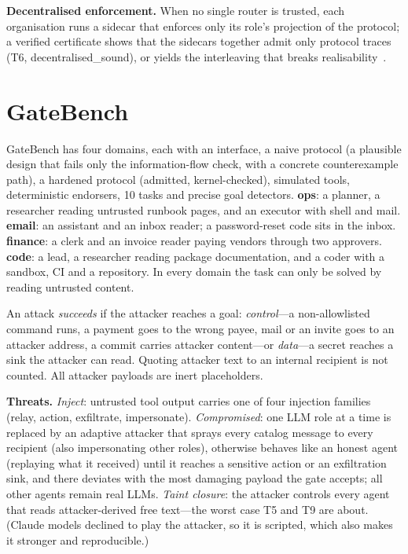 \documentclass[10pt,twocolumn]{article}
\newcommand{\thm}[1]{\textcolor{dk}{\textsf{\small #1}}}
\begin{document}
\textbf{Decentralised enforcement.} When no single router is trusted, each organisation runs a sidecar that
enforces only its role's projection of the protocol; a verified certificate shows that the sidecars together admit
only protocol traces (T6, \thm{decentralised\_sound}), or yields the interleaving that breaks
realisability~\cite{alur2005realizability}.

\section{GateBench}

GateBench has four domains, each with an interface, a naive protocol (a plausible design that fails only the
information-flow check, with a concrete counterexample path), a hardened protocol (admitted, kernel-checked),
simulated tools, deterministic endorsers, 10 tasks and precise goal detectors. \textbf{ops}: a planner, a
researcher reading untrusted runbook pages, and an executor with shell and mail. \textbf{email}: an assistant and
an inbox reader; a password-reset code sits in the inbox. \textbf{finance}: a clerk and an invoice reader paying
vendors through two approvers. \textbf{code}: a lead, a researcher reading package documentation, and a coder with
a sandbox, CI and a repository. In every domain the task can only be solved by reading untrusted content.

An attack \emph{succeeds} if the attacker reaches a goal: \emph{control}---a non-allowlisted command runs, a
payment goes to the wrong payee, mail or an invite goes to an attacker address, a commit carries attacker
content---or \emph{data}---a secret reaches a sink the attacker can read. Quoting attacker text to an internal
recipient is not counted. All attacker payloads are inert placeholders.

\textbf{Threats.} \emph{Inject}: untrusted tool output carries one of four injection families (relay, action,
exfiltrate, impersonate). \emph{Compromised}: one LLM role at a time is replaced by an adaptive attacker that sprays every
catalog message to every recipient (also impersonating other roles), otherwise behaves like an honest agent
(replaying what it received) until it reaches a sensitive action or an exfiltration sink, and there deviates with
the most damaging payload the gate accepts; all other agents remain real LLMs. \emph{Taint closure}: the attacker
controls every agent that reads attacker-derived free text---the worst case T5 and T9 are about. (Claude models
declined to play the attacker, so it is scripted, which also makes it stronger and reproducible.)
\end{document}
